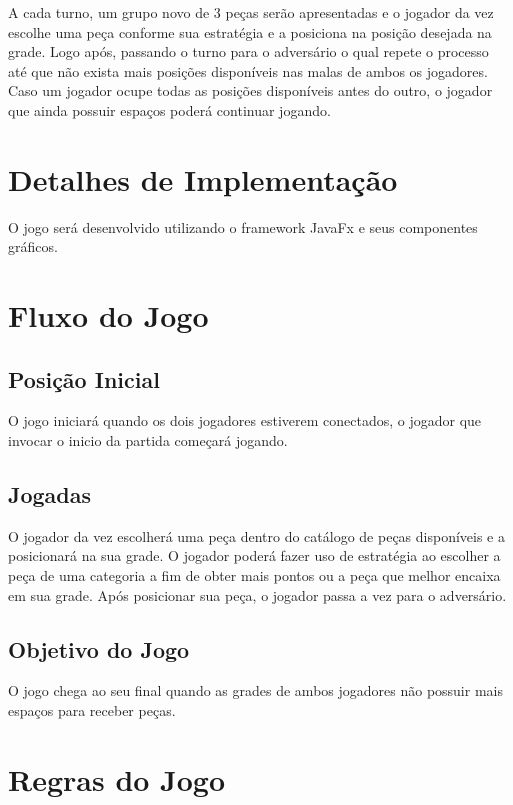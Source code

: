 \documentclass[
	12pt,	
	openany,			
	oneside,			
	a4paper,			
	english,			
	french,			
	spanish,			
	brazil,	
	]{abntex2}
\begin{document}
A cada turno, um grupo novo de 3 peças serão apresentadas e o jogador da vez escolhe uma peça conforme sua estratégia e a posiciona na posição desejada na grade. Logo após, passando o turno para o adversário o qual repete o processo até que não exista mais posições disponíveis nas malas de ambos os jogadores. Caso um jogador ocupe todas as posições disponíveis antes do outro, o jogador que ainda possuir espaços poderá continuar jogando.
 
\section{Detalhes de Implementação}

O jogo será desenvolvido utilizando o framework JavaFx e seus componentes gráficos.

\section{Fluxo do Jogo}

\subsection{Posição Inicial}

O jogo iniciará quando os dois jogadores estiverem conectados, o jogador que invocar o inicio da partida começará jogando. 

\subsection{Jogadas}

O jogador da vez escolherá uma peça dentro do catálogo de peças disponíveis e a posicionará na sua grade. O jogador poderá fazer uso de estratégia ao escolher a peça de uma categoria a fim de obter mais pontos ou a peça que melhor encaixa em sua grade. Após posicionar sua peça, o jogador passa a vez para o adversário.

\subsection{Objetivo do Jogo}

O jogo chega ao seu final quando as grades de ambos jogadores não possuir mais espaços para receber peças.

\section{Regras do Jogo}
\end{document}
